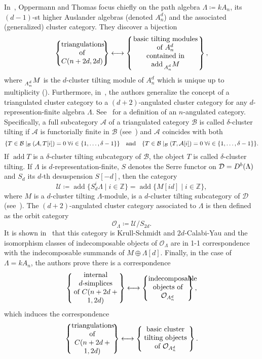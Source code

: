 \documentclass[a4paper,oneside,svgnames]{amsart}
\theoremstyle{plain}
\theoremstyle{definition}
\let\hom\relax
\let\mod\relax
\DeclareMathOperator{\add}{add}
\DeclareMathOperator{\hom}{Hom}
\DeclareMathOperator{\mod}{mod}
\newcommand{\Z}{\mathbb{Z}}
\begin{document}
 In~\cite{ot}, Oppermann and Thomas focus chiefly on the path algebra $\Lambda
 \coloneqq kA_n$, its $(d-1)$-st higher Auslander algebras (denoted $A^{d}_n$)
 and the associated (generalized) cluster category. They discover a bijection
 \[
  \left\{ 
   \parbox{.17\textwidth}{
    \centering
    triangulations of\\
    $C(n+2d,2d)$
   }
  \right\}
  \longleftrightarrow
  \left\{ 
   \parbox{.27\textwidth}{
    \centering
    basic tilting modules of $A^{d}_n$\\
    contained in $\add\prescript{}{A^{d}_n}{M}$
   }
  \right\},
 \]
 where $\prescript{}{A^{d}_n}{M}$ is the $d$-cluster tilting module of $A^{d}_n$
 which is unique up to multiplicity (\cite{iya}). Furthermore,
 in~\cite[Section~5]{ot}, the authors generalize the concept of a triangulated
 cluster category to a $(d+2)$-angulated cluster category for any
 $d$-represention-finite algebra $\Lambda$. See~\cite{gko} for a definition of
 an $n$-angulated category. Specifically, a full subcategory $\mathcal{A}$ of a
 triangulated category $\mathcal{B}$ is called $\delta$-cluster tilting if
 $\mathcal{A}$ is functorially finite in $\mathcal{B}$ (see~\cite{as}) and
 $\mathcal{A}$ coincides with both
 \[
  \{T \in \mathcal{B} \mid \hom_{\mathcal{B}}(\mathcal{A},T[i]) = 0 \; \forall
  i \in \{1,\ldots,\delta-1\}\} \quad \text{and} \quad \{T \in \mathcal{B} \mid
  \hom_{\mathcal{B}}(T,\mathcal{A}[i]) = 0 \; \forall i \in
  \{1,\ldots,\delta-1\}\}.
 \]
 If $\add T$ is a $\delta$-cluster tilting subcategory of $\mathcal{B}$, the
 object $T$ is called $\delta$-cluster tilting. If $\Lambda$ is
 $d$-representation-finite, $S$ denotes the Serre functor on $\mathcal{D} =
 D^{b}(\mod\Lambda)$ and $S_d$ its $d$-th desuspension $S[-d]$, then the
 category
 \[
  \mathcal{U} \coloneqq \add \{S^{i}_d\Lambda \mid i \in \Z\} = \add \{M[id]
  \mid i \in \Z\},
 \]
 where $M$ is a $d$-cluster tilting $\Lambda$-module, is a $d$-cluster tilting
 subcategory of $\mathcal{D}$ (see~\cite[Theorem 1.23]{iya}). The
 $(d+2)$-angulated cluster category associated to $\Lambda$ is then defined as
 the orbit category
 \[
  \mathcal{O}_{\Lambda} \coloneqq \mathcal{U} / S_{2d}.
 \]
 It is shown in~\cite[Theorem~5.2]{ot} that this category is Krull-Schmidt and
 $2d$-Calabi-Yau and the isomorphism classes of indecomposable objects of
 $\mathcal{O}_{\Lambda}$ are in 1-1 correspondence with the indecomposable
 summands of $M \oplus \Lambda[d]$. Finally, in the case of $\Lambda = kA_n$,
 the authors prove there is a correspondence
 \[
  \left\{ 
   \parbox{.19\textwidth}{
    \centering
    internal $d$-simplices\\
    of $C(n+2d+1,2d)$
   }
  \right\}
  \longleftrightarrow
  \left\{ 
   \parbox{.16\textwidth}{
    \centering
    indecomposable
    objects of $\mathcal{O}_{A^{d}_n}$
   }
  \right\},
 \]
 which induces the correspondence
 \[
  \left\{ 
   \parbox{.17\textwidth}{
    \centering
    triangulations of\\
    $C(n+2d+1,2d)$
   }
  \right\}
  \longleftrightarrow
  \left\{ 
   \parbox{.19\textwidth}{
    \centering
    basic cluster tilting
    objects of $\mathcal{O}_{A^{d}_n}$
   }
  \right\}.
 \]
\end{document}
